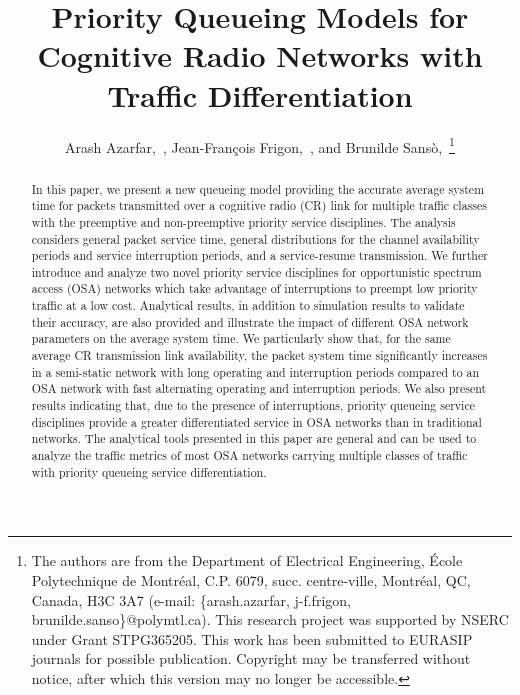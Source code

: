 \documentclass[11pt,journal,oneside,onecolumn,draftclsnofoot]{IEEEtran}
\begin{document}
\title{Priority Queueing Models for Cognitive Radio Networks with Traffic Differentiation}
\author{Arash Azarfar,~, Jean-Fran\c{c}ois Frigon,~, and Brunilde Sans\`o,~\thanks{The authors are from the Department of Electrical Engineering, \'{E}cole Polytechnique de Montr\'{e}al, C.P. 6079, succ. centre-ville, Montr\'{e}al, QC, Canada, H3C 3A7 (e-mail: \{arash.azarfar, j-f.frigon, brunilde.sanso\}@polymtl.ca). \newline \indent This research project was supported by NSERC under Grant STPG365205. \newline This work has been submitted to EURASIP journals for possible
publication. Copyright may be transferred without notice, after which this version may no
longer be accessible.}}



\maketitle

\begin{abstract}
In this paper, we present a new queueing model providing the accurate average system time for packets transmitted over a cognitive radio (CR) link for multiple traffic classes with the preemptive and non-preemptive priority service disciplines. The analysis considers general packet service time, general distributions for the channel availability periods and service interruption periods, and a service-resume transmission. We further introduce and analyze two novel priority service disciplines for opportunistic spectrum access (OSA) networks which take advantage of interruptions to preempt low priority traffic at a low cost. Analytical results, in addition to simulation results to validate their accuracy, are also provided and illustrate the impact of different OSA network parameters on the average system time. We particularly show that, for the same average CR transmission link availability, the packet system time significantly increases in a semi-static network with long operating and interruption periods compared to an OSA network with fast alternating operating and interruption periods. We also present results indicating that, due to the presence of interruptions, priority queueing service disciplines provide a greater differentiated service in OSA networks than in traditional networks. The analytical tools presented in this paper are general and can be used to analyze the traffic metrics of most OSA networks carrying multiple classes of traffic with priority queueing service differentiation. 

\end{abstract}
\end{document}
